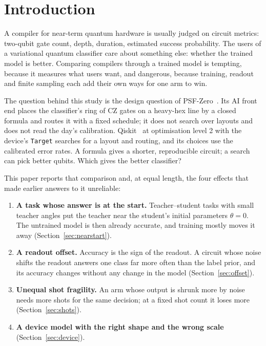 \documentclass[11pt]{article}
\begin{document}
\section{Introduction}

A compiler for near-term quantum hardware is usually judged on circuit metrics: two-qubit gate count, depth, duration,
estimated success probability. The users of a variational quantum classifier care about something else: whether the
trained model is better. Comparing compilers through a trained model is tempting, because it measures what users
want, and dangerous, because training, readout and finite sampling each add their own ways for one arm to win.

The question behind this study is the design question of PSF-Zero~\cite{psfzero}. Its AI front end places the
classifier's ring of CZ gates on a heavy-hex line by a closed formula and routes it with a fixed schedule; it does not
search over layouts and does not read the day's calibration. Qiskit~\cite{qiskit} at optimisation level 2 with the
device's \texttt{Target} searches for a layout and routing, and its choices use the calibrated error rates. A formula
gives a shorter, reproducible circuit; a search can pick better qubits. Which gives the better classifier?

This paper reports that comparison and, at equal length, the four effects that made earlier answers to it unreliable:

\begin{enumerate}
\item \textbf{A task whose answer is at the start.} Teacher--student tasks with small teacher angles put the teacher
near the student's initial parameters $\theta = 0$. The untrained model is then already accurate, and training mostly
moves it away (Section~\ref{sec:nearstart}).
\item \textbf{A readout offset.} Accuracy is the sign of the readout. A circuit whose noise shifts the readout
answers one class far more often than the label prior, and its accuracy changes without any change in the model
(Section~\ref{sec:offset}).
\item \textbf{Unequal shot fragility.} An arm whose output is shrunk more by noise needs more shots for the same
decision; at a fixed shot count it loses more (Section~\ref{sec:shots}).
\item \textbf{A device model with the right shape and the wrong scale} (Section~\ref{sec:device}).
\end{enumerate}
\end{document}
